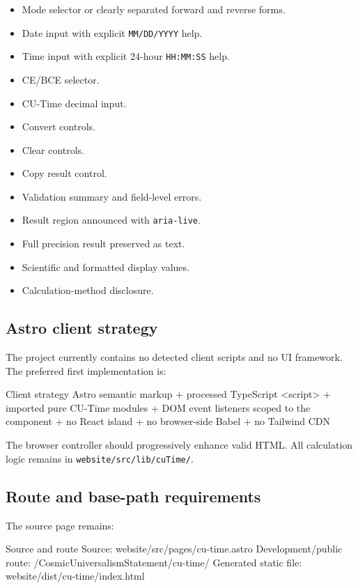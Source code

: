 \documentclass[11pt,letterpaper]{article}
\begin{document}
\begin{itemize}
    \item Mode selector or clearly separated forward and reverse forms.
    \item Date input with explicit \texttt{MM/DD/YYYY} help.
    \item Time input with explicit 24-hour \texttt{HH:MM:SS} help.
    \item CE/BCE selector.
    \item CU-Time decimal input.
    \item Convert controls.
    \item Clear controls.
    \item Copy result control.
    \item Validation summary and field-level errors.
    \item Result region announced with \texttt{aria-live}.
    \item Full precision result preserved as text.
    \item Scientific and formatted display values.
    \item Calculation-method disclosure.
\end{itemize}

\subsection{Astro client strategy}

The project currently contains no detected client scripts and no UI framework.
The preferred first implementation is:

\begin{codebox}{Client strategy}
Astro semantic markup
  + processed TypeScript <script>
  + imported pure CU-Time modules
  + DOM event listeners scoped to the component
  + no React island
  + no browser-side Babel
  + no Tailwind CDN
\end{codebox}

The browser controller should progressively enhance valid HTML. All calculation
logic remains in \nolinkurl{website/src/lib/cuTime/}.

\subsection{Route and base-path requirements}

The source page remains:

\begin{codebox}{Source and route}
Source: website/src/pages/cu-time.astro
Development/public route:
/CosmicUniversalismStatement/cu-time/
Generated static file:
website/dist/cu-time/index.html
\end{codebox}
\end{document}

